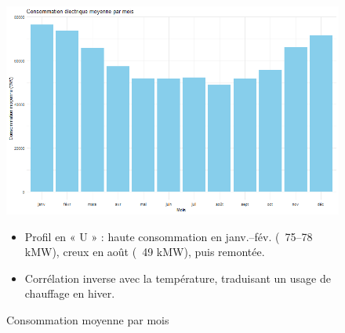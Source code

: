 \documentclass[12pt,a4paper]{article}
\begin{document}
\begin{figure}[H]
  \centering
  \begin{minipage}[t]{0.48\textwidth}
    \centering
    \includegraphics[width=\linewidth]{Projet_partie_A/conso_moyenne_par_mois.png}
    \caption{Consommation moyenne par mois}
    \label{fig:conso_moyenne_mois}
  \end{minipage}
  \hfill
  \begin{minipage}[t]{0.48\textwidth}
    \small
    \begin{itemize}
      \item Profil en « U » : haute consommation en janv.–fév. (~75–78 kMW), creux en août (~49 kMW), puis remontée.  
      \item Corrélation inverse avec la température, traduisant un usage de chauffage en hiver.  
    \end{itemize}
  \end{minipage}
\end{figure}
\end{document}
